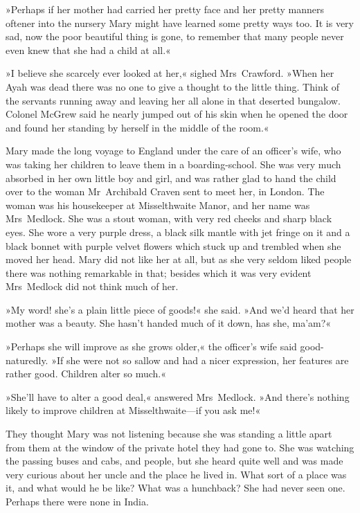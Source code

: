 »Perhaps if her mother had carried her pretty face and her pretty manners oftener into the nursery Mary might have learned some pretty ways too. It is very sad, now the poor beautiful thing is gone, to remember that many people never even knew that she had a child at all.«

»I believe she scarcely ever looked at her,« sighed Mrs~Crawford. »When her Ayah was dead there was no one to give a thought to the little thing. Think of the servants running away and leaving her all alone in that deserted bungalow. Colonel McGrew said he nearly jumped out of his skin when he opened the door and found her standing by herself in the middle of the room.«

Mary made the long voyage to England under the care of an officer's wife, who was taking her children to leave them in a boarding-school. She was very much absorbed in her own little boy and girl, and was rather glad to hand the child over to the woman Mr~Archibald Craven sent to meet her, in London. The woman was his housekeeper at Misselthwaite Manor, and her name was Mrs~Medlock. She was a stout woman, with very red cheeks and sharp black eyes. She wore a very purple dress, a black silk mantle with jet fringe on it and a black bonnet with purple velvet flowers which stuck up and trembled when she moved her head. Mary did not like her at all, but as she very seldom liked people there was nothing remarkable in that; besides which it was very evident Mrs~Medlock did not think much of her.

»My word! she's a plain little piece of goods!« she said. »And we'd heard that her mother was a beauty. She hasn't handed much of it down, has she, ma'am?«

»Perhaps she will improve as she grows older,« the officer's wife said good-naturedly. »If she were not so sallow and had a nicer expression, her features are rather good. Children alter so much.«

»She'll have to alter a good deal,« answered Mrs~Medlock. »And there's nothing likely to improve children at Misselthwaite—if you ask me!«

They thought Mary was not listening because she was standing a little apart from them at the window of the private hotel they had gone to. She was watching the passing buses and cabs, and people, but she heard quite well and was made very curious about her uncle and the place he lived in. What sort of a place was it, and what would he be like? What was a hunchback? She had never seen one. Perhaps there were none in India.

